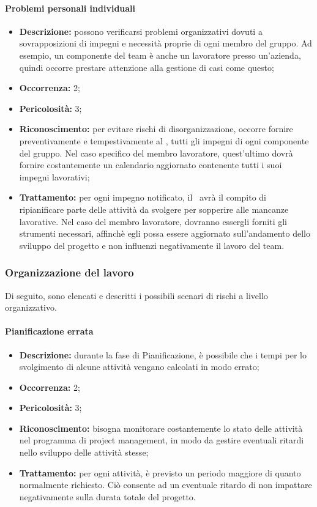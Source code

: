 \paragraph{Problemi personali individuali}
\begin{itemize}
	\item \textbf{Descrizione:} possono verificarsi problemi organizzativi dovuti a sovrapposizioni di impegni e necessità proprie di ogni membro del gruppo. Ad esempio, un componente del team è anche un lavoratore presso un'azienda, quindi occorre prestare attenzione alla gestione di casi come questo;
	\item \textbf{Occorrenza:} 2;
	\item \textbf{Pericolosità:} 3;
	\item \textbf{Riconoscimento:} per evitare rischi di disorganizzazione, occorre fornire preventivamente e tempestivamente al \Res, tutti gli impegni di ogni componente del gruppo. Nel caso specifico del membro lavoratore, quest'ultimo dovrà fornire costantemente un calendario aggiornato contenente tutti i suoi impegni lavorativi;
	\item \textbf{Trattamento:} per ogni impegno notificato, il \Res\ avrà il compito di ripianificare parte delle attività da svolgere per sopperire alle mancanze lavorative. Nel caso del membro lavoratore, dovranno essergli forniti gli strumenti necessari, affinchè egli possa essere aggiornato sull'andamento dello sviluppo del progetto e non influenzi negativamente il lavoro del team.
\end{itemize}

\subsubsection{Organizzazione del lavoro}

Di seguito, sono elencati e descritti i possibili scenari di rischi a livello organizzativo.

\paragraph{Pianificazione errata}
\begin{itemize}
	\item \textbf{Descrizione:} durante la fase di Pianificazione, è possibile che i tempi per lo svolgimento di alcune attività vengano calcolati in modo errato;
	\item \textbf{Occorrenza:} 2;
	\item \textbf{Pericolosità:} 3;
	\item \textbf{Riconoscimento:} bisogna monitorare costantemente lo stato delle attività nel programma di project management, in modo da gestire eventuali ritardi nello sviluppo delle attività stesse;
	\item \textbf{Trattamento:} per ogni attività, è previsto un periodo maggiore di quanto normalmente richiesto. Ciò consente ad un eventuale ritardo di non impattare negativamente sulla durata totale del progetto.
\end{itemize}

